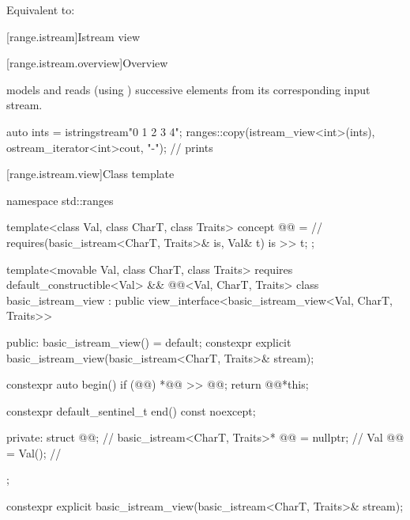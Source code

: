 \begin{itemdescr}
\pnum
\effects
Equivalent to: 
\end{itemdescr}

[range.istream]{Istream view}

[range.istream.overview]{Overview}

\pnum
{} models  and
reads (using ) successive elements
from its corresponding input stream.

\pnum
\begin{example}
\begin{codeblock}
auto ints = istringstream{"0 1  2   3     4"};
ranges::copy(istream_view<int>(ints), ostream_iterator<int>{cout, "-"});
// prints 
\end{codeblock}
\end{example}

[range.istream.view]{Class template }

%
\begin{codeblock}
namespace std::ranges {
  template<class Val, class CharT, class Traits>
    concept @@ =                // \expos
      requires(basic_istream<CharT, Traits>& is, Val& t) {
         is >> t;
      };

  template<movable Val, class CharT, class Traits>
    requires default_constructible<Val> &&
      @@<Val, CharT, Traits>
  class basic_istream_view : public view_interface<basic_istream_view<Val, CharT, Traits>> {
  public:
    basic_istream_view() = default;
    constexpr explicit basic_istream_view(basic_istream<CharT, Traits>& stream);

    constexpr auto begin()
    {
      if (@@) {
        *@@ >> @@;
      }
      return @@{*this};
    }

    constexpr default_sentinel_t end() const noexcept;

  private:
    struct @@;                                    // \expos
    basic_istream<CharT, Traits>* @@ = nullptr;    // \expos
    Val @@ = Val();                                // \expos
  };
}
\end{codeblock}

%
\begin{itemdecl}
constexpr explicit basic_istream_view(basic_istream<CharT, Traits>& stream);
\end{itemdecl}

